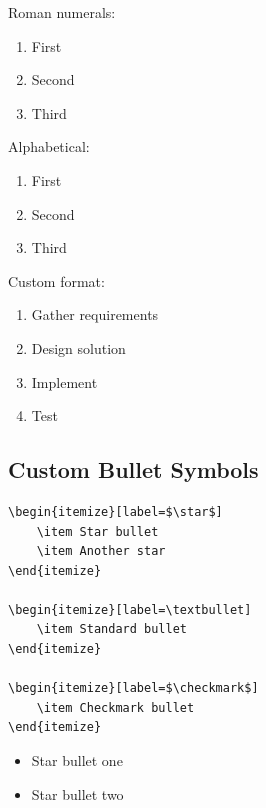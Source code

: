 Roman numerals:
\begin{enumerate}[label=\Roman*.]
    \item First
    \item Second
    \item Third
\end{enumerate}

Alphabetical:
\begin{enumerate}[label=\alph*)]
    \item First
    \item Second
    \item Third
\end{enumerate}

Custom format:
\begin{enumerate}[label=Step \arabic*:]
    \item Gather requirements
    \item Design solution
    \item Implement
    \item Test
\end{enumerate}

\subsection{Custom Bullet Symbols}

\begin{lstlisting}[language={[LaTeX]TeX}, caption=Custom bullets]
\begin{itemize}[label=$\star$]
    \item Star bullet
    \item Another star
\end{itemize}

\begin{itemize}[label=\textbullet]
    \item Standard bullet
\end{itemize}

\begin{itemize}[label=$\checkmark$]
    \item Checkmark bullet
\end{itemize}
\end{lstlisting}

\begin{itemize}[label=$\star$]
    \item Star bullet one
    \item Star bullet two
\end{itemize}

